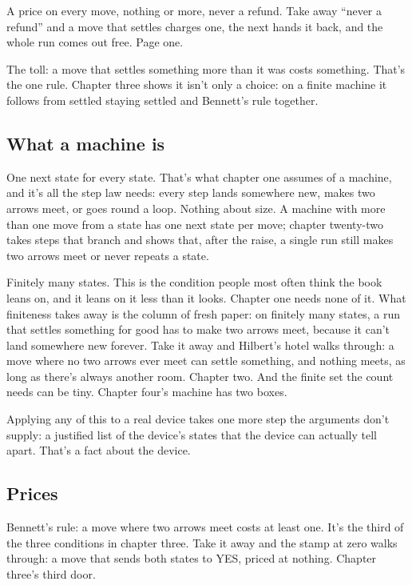 \documentclass[11pt,twoside]{article}
\theoremstyle{thielethm}
\theoremstyle{thieledef}
\theoremstyle{thieledef}
\theoremstyle{thieledef}
\theoremstyle{thielethm}
\theoremstyle{thieleobs}
\theoremstyle{thielethm}
\begin{document}
A price on every move, nothing or more, never a refund. Take away ``never a refund'' and a move that settles charges one, the next hands it back, and the whole run comes out free. Page one.

The toll: a move that settles something more than it was costs something. That's the one rule. Chapter three shows it isn't only a choice: on a finite machine it follows from settled staying settled and Bennett's rule together.

\subsection{What a machine is}

One next state for every state. That's what chapter one assumes of a machine, and it's all the step law needs: every step lands somewhere new, makes two arrows meet, or goes round a loop. Nothing about size. A machine with more than one move from a state has one next state per move; chapter twenty-two takes steps that branch and shows that, after the raise, a single run still makes two arrows meet or never repeats a state.

Finitely many states. This is the condition people most often think the book leans on, and it leans on it less than it looks. Chapter one needs none of it. What finiteness takes away is the column of fresh paper: on finitely many states, a run that settles something for good has to make two arrows meet, because it can't land somewhere new forever. Take it away and Hilbert's hotel walks through: a move where no two arrows ever meet can settle something, and nothing meets, as long as there's always another room. Chapter two. And the finite set the count needs can be tiny. Chapter four's machine has two boxes.

Applying any of this to a real device takes one more step the arguments don't supply: a justified list of the device's states that the device can actually tell apart. That's a fact about the device.

\subsection{Prices}

Bennett's rule: a move where two arrows meet costs at least one. It's the third of the three conditions in chapter three. Take it away and the stamp at zero walks through: a move that sends both states to YES, priced at nothing. Chapter three's third door.
\end{document}
